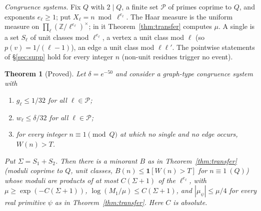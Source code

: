 \documentclass[11pt,reqno]{amsart}
\newtheorem{theorem}{Theorem}[section]
\theoremstyle{definition}
\begin{document}
\emph{Congruence systems.}  Fix $Q$ with $2\mid Q$, a finite set $\mathcal P$ of
primes coprime to $Q$, and exponents $e_\ell\ge1$; put $X_\ell=n\bmod\ell^{e_\ell}$.
The Haar measure is the uniform measure on $\prod_\ell(\mathbb Z/\ell^{e_\ell})^\times$;
in it Theorem~\ref{thm:transfer} computes $\mu$.  A single is a set $S_\ell$ of
unit classes mod $\ell^{e_\ell}$, a vertex a unit class mod $\ell$ (so
$p(v)=1/(\ell-1)$), an edge a unit class mod $\ell\ell'$.  The pointwise
statements of \S\ref{sec:supp} hold for every integer $n$ (non-unit residues
trigger no event).

\begin{theorem}[Proved]\label{thm:crit}
Let $\delta=e^{-50}$ and consider a graph-type congruence system with
\begin{enumerate}
\item[(G)] $g_\ell\le1/32$ for all $\ell\in\mathcal P$;
\item[(W)] $w_\ell\le\delta/32$ for all $\ell\in\mathcal P$;
\item[(I)] for every integer $n\equiv1\pmod Q$ at which no single and no edge
occurs, $W(n)>T$.
\end{enumerate}
Put $\Sigma=S_1+S_2$.  Then there is a minorant $B$ as in
Theorem~\ref{thm:transfer} (moduli coprime to $Q$, unit classes,
$B(n)\le\mathbf 1[W(n)>T]$ for $n\equiv1\ (Q)$) whose moduli are products of at
most $C(\Sigma+1)$ of the $\ell^{e_\ell}$, with $\mu\ge\exp(-C(\Sigma+1))$,
$\log(M_1/\mu)\le C(\Sigma+1)$, and $|\mu_\psi|\le\mu/4$ for every real primitive
$\psi$ as in Theorem~\ref{thm:transfer}.  Here $C$ is absolute.
\end{theorem}
\end{document}
